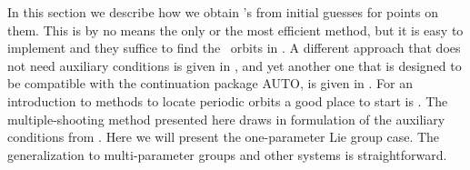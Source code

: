 In this section we describe how we obtain \rpo's from
initial guesses for points on them. This is by no means 
the only or the most efficient method, but it is easy
to implement and they suffice to find the 
\KS\ orbits in . A different approach
that does not need auxiliary conditions is given in 
, and yet another one that is designed
to be compatible with the continuation package AUTO, 
is given in . For an introduction to
methods to locate periodic orbits a good place to start
is . The multiple-shooting method
presented here draws in formulation of the auxiliary
conditions from .
Here we will present the one-parameter Lie group case.
The generalization to multi-parameter groups and other systems is straightforward. 


% 
% 

